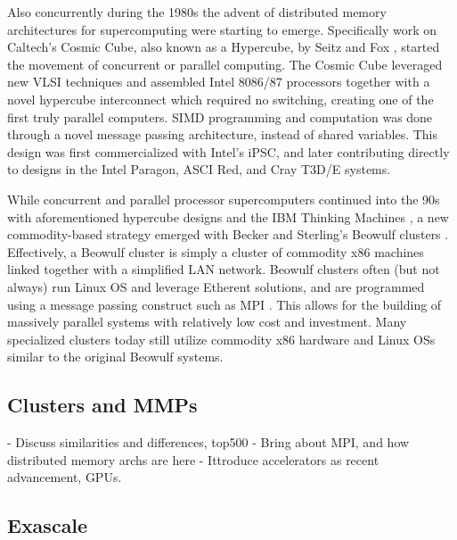 Also concurrently during the 1980s the advent of distributed memory architectures for supercomputing were starting to emerge. Specifically work on Caltech's Cosmic Cube, also known as a Hypercube, by Seitz and Fox \cite{seitz1985cosmic, fox1987matrix}, started the movement of concurrent or parallel computing.  The Cosmic Cube leveraged new VLSI techniques and assembled Intel 8086/87 processors together with a novel hypercube interconnect which required no switching, creating one of the first truly parallel computers. SIMD programming and computation was done through a novel message passing architecture, instead of shared variables.  This design was first commercialized with Intel's iPSC, and later contributing directly to designs in the Intel Paragon, ASCI Red, and Cray T3D/E systems.  

While concurrent and parallel processor supercomputers continued into the 90s with aforementioned hypercube designs and the IBM Thinking Machines \cite{cm1}, a new commodity-based strategy emerged with Becker and Sterling's Beowulf clusters \cite{sterling2001beowulf}. Effectively, a Beowulf cluster is simply a cluster of commodity x86 machines linked together with a simplified LAN network. Beowulf clusters often (but not always) run Linux OS and leverage Etherent solutions, and are programmed using a message passing construct such as MPI \cite{mpi}. This allows for the building of massively parallel systems with relatively low cost and investment. Many specialized clusters today still utilize commodity x86 hardware and Linux OSs similar to the original Beowulf systems.   




\subsection{Clusters and MMPs}

 - Discuss similarities and differences, top500
 - Bring about MPI, and how distributed memory archs are here
 - Ittroduce accelerators as recent advancement, GPUs.

\subsection{Exascale}



